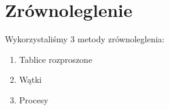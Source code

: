 \section{Zrównoleglenie} 
Wykorzystaliśmy 3 metody zrównoleglenia: 
\begin{enumerate} 
    \item Tablice rozproszone 
    \item Wątki 
    \item Procesy
\end{enumerate}
	
	
	
	
	
	
